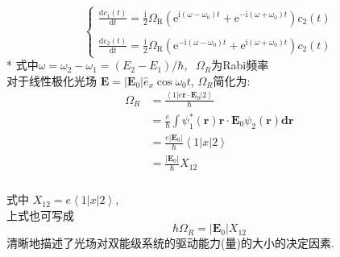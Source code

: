 \begin{frame} 
 \frametitle{}
 \[ \begin{cases}
    \frac{\mathrm{d}c_1(t)}{\mathrm{d}t}=\frac{\mathrm{i}}{2} \Omega_{\mathrm{R}}\left(\mathrm{e}^{\mathrm{i}\left(\omega-\omega_{0}\right) t}+\mathrm{e}^{-\mathrm{i}\left(\omega+\omega_{0}\right) t}\right) c_{2}(t) \\ 
    ~\\
    \frac{\mathrm{d}c_2(t)}{\mathrm{d}t}=\frac{\mathrm{i}}{2} \Omega_{\mathrm{R}}\left(\mathrm{e}^{-\mathrm{i}\left(\omega-\omega_{0}\right) t}+\mathrm{e}^{\mathrm{i}\left(\omega+\omega_{0}\right) t}\right) c_{2}(t)
 \end{cases} \]
 * 式中$\omega= \omega_2-\omega_1= (E_2-E_1)/\hbar$, $~~\Omega_R$为Rabi频率 \\ 
  对于线性极化光场 $\mathbf{E}=\left|\mathbf{E}_0\right| \hat{e}_x \cos \omega_0 t $, $\Omega_R$简化为:
 \[ \begin{aligned}
     \Omega_R & =\frac{\left\langle 1| e \mathbf{r}\cdot \mathbf{E}_0 |2 \right\rangle }{\hbar}\\
     &= \frac{e}{\hbar}\int \psi^* _1(\mathbf{r})\mathbf{r}\cdot \mathbf {E}_0 \psi _2(\mathbf{r}) \mathbf{dr}\\
     &= \frac{e\left|\mathbf{E}_0\right|}{\hbar} \left\langle 1| x|2 \right\rangle \\
     &= \frac{\left|\mathbf{E}_0\right|}{\hbar} X_{12}
 \end{aligned}\] 
 \end{frame}
 
 \begin{frame} 
 \frametitle{}   
 式中 $X_{12} = e\left\langle 1| x|2 \right\rangle$, \\
 上式也可写成 \[\hbar \Omega_R= \left| \mathbf{E}_0 \right| X_{12}\]
 清晰地描述了光场对双能级系统的驱动能力(量)的大小的决定因素. 
\end{frame}

